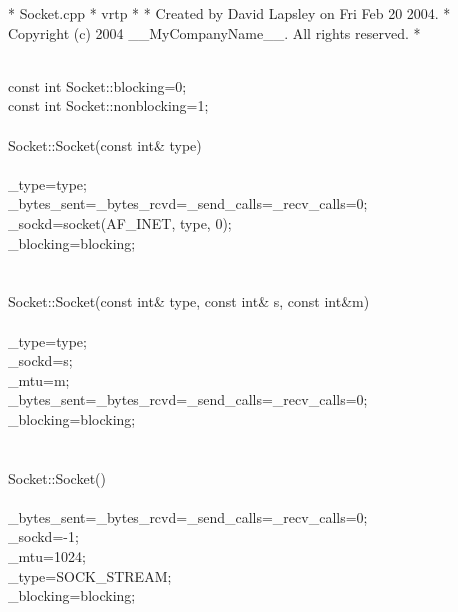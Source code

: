 \documentclass{article}
\begin{document}
 *  Socket.cpp
 *  vrtp
 *
 *  Created by David Lapsley on Fri Feb 20 2004.
 *  Copyright (c) 2004 __MyCompanyName__. All rights reserved.
 *
 \strut\goodbreak
{}\strut\nopagebreak\\
 const int Socket::blocking=0;
\\
 const int Socket::nonblocking=1;
\\
 
\\
 Socket::Socket(const int& type)
\\
 {
\\
         _type=type;
\\
         _bytes_sent=_bytes_rcvd=_send_calls=_recv_calls=0;
\\
         _sockd=socket(AF_INET, type, 0);
\\
         _blocking=blocking;
\\
 }
\\
 
\\
 Socket::Socket(const int& type, const int& s, const int&m)
\\
 {
\\
         _type=type;
\\
         _sockd=s;
\\
         _mtu=m;
\\
         _bytes_sent=_bytes_rcvd=_send_calls=_recv_calls=0;
\\
         _blocking=blocking;
\\
 }
\\
 
\\
 Socket::Socket() 
\\
 {
\\
         _bytes_sent=_bytes_rcvd=_send_calls=_recv_calls=0;
\\
         _sockd=-1;
\\
         _mtu=1024;
\\
         _type=SOCK_STREAM;
\\
         _blocking=blocking;
\\
 }
\\
 
\end{document}
